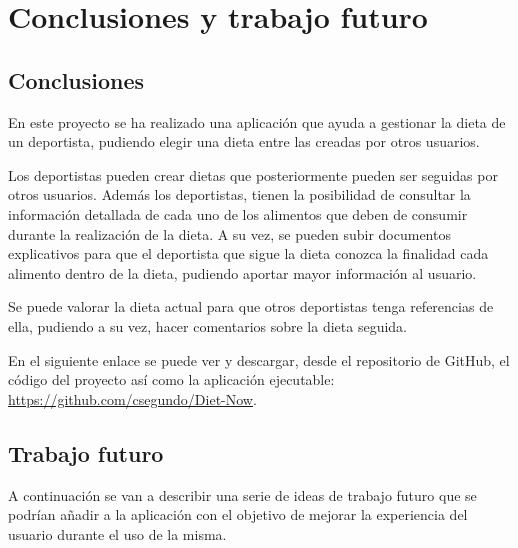 \chapter{Conclusiones y trabajo futuro}
\noindent

\section{Conclusiones}
En este proyecto se ha realizado una aplicación que ayuda a gestionar la dieta de un deportista, pudiendo elegir una dieta entre las creadas por otros usuarios. 

Los deportistas pueden crear dietas que posteriormente pueden ser seguidas por otros usuarios. Además los deportistas, tienen la posibilidad de consultar la información detallada de cada uno de los alimentos que deben de consumir durante la realización de la dieta. A su vez, se pueden subir documentos explicativos para que el deportista que sigue la dieta conozca la finalidad cada alimento dentro de la dieta, pudiendo aportar mayor información al usuario.

Se puede valorar la dieta actual para que otros deportistas tenga referencias de ella, pudiendo a su vez, hacer comentarios sobre la dieta seguida.


En el siguiente enlace se puede ver y descargar, desde el repositorio de GitHub, el código del proyecto así como la aplicación ejecutable: \url{https://github.com/csegundo/Diet-Now}.

\section{Trabajo futuro}
A continuación se van a describir una serie de ideas de trabajo futuro que se podrían añadir a la aplicación con el objetivo de mejorar la experiencia del usuario durante el uso de la misma.

